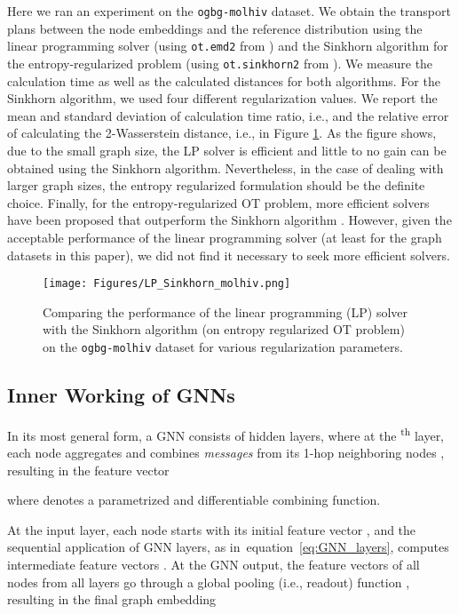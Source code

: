 \documentclass[table]{article} \usepackage{iclr2021_conference,times}
\def\eqref#1{equation~\ref{#1}}
\begin{document}
Here we ran an experiment on the \texttt{ogbg-molhiv} dataset. We obtain the transport plans between the node embeddings and the reference distribution using the linear programming solver (using \texttt{ot.emd2} from \citep{flamary2017pot}) and the Sinkhorn algorithm for the entropy-regularized problem (using \texttt{ot.sinkhorn2} from \citep{flamary2017pot}). We measure the calculation time as well as the calculated distances for both algorithms. For the Sinkhorn algorithm, we used four different regularization values. We report the mean and standard deviation of calculation time ratio, i.e.,  and the relative error of calculating the 2-Wasserstein distance, i.e.,  in Figure \ref{fig:sink}. As the figure shows, due to the small graph size, the LP solver is efficient and little to no gain can be obtained using the Sinkhorn algorithm. Nevertheless, in the case of dealing with larger graph sizes, the entropy regularized formulation should be the definite choice. Finally, for the entropy-regularized OT problem, more efficient solvers have been proposed that outperform the Sinkhorn algorithm \citep{dvurechensky2018computational}. However, given the acceptable performance of the linear programming solver (at least for the graph datasets in this paper), we did not find it necessary to seek more efficient solvers. 

\begin{figure}
    \centering
    \texttt{[image: Figures/LP\_Sinkhorn\_molhiv.png]}
    \caption{Comparing the performance of the linear programming (LP) solver with the Sinkhorn algorithm (on entropy regularized OT problem) on the \texttt{ogbg-molhiv} dataset for various regularization parameters.}
    \label{fig:sink}
\end{figure}

\subsection{Inner Working of GNNs}\label{sec:appx:gnns}
In its most general form, a GNN consists of  hidden layers, where at the \textsuperscript{th} layer, each node  aggregates and combines \emph{messages} from its 1-hop neighboring nodes , resulting in the feature vector
\vspace{-.03in}

where  denotes a parametrized and differentiable combining function.

At the input layer, each node  starts with its initial feature vector , and the sequential application of GNN layers, as in~\eqref{eq:GNN_layers}, computes intermediate feature vectors . At the GNN output, the feature vectors of all nodes from all layers go through a global pooling (i.e., readout) function , resulting in the final graph embedding
\end{document}
